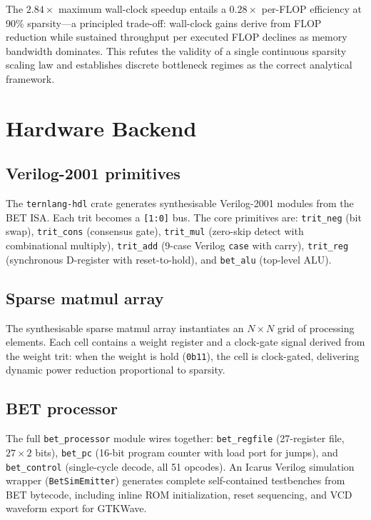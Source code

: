 \documentclass[journal,10pt,twocolumn]{IEEEtran}
\begin{document}
The $2.84\times$ maximum wall-clock speedup entails a $0.28\times$ per-FLOP
efficiency at 90\% sparsity---a principled trade-off: wall-clock gains
derive from FLOP reduction while sustained throughput per executed FLOP
declines as memory bandwidth dominates. This refutes the validity of a single
continuous sparsity scaling law and establishes discrete bottleneck regimes as
the correct analytical framework.

\section{Hardware Backend}
\label{sec:hdl}

\subsection{Verilog-2001 primitives}

The \texttt{ternlang-hdl} crate generates synthesisable Verilog-2001 modules
from the BET ISA. Each trit becomes a \texttt{[1:0]} bus. The core primitives
are: \texttt{trit\_neg} (bit swap), \texttt{trit\_cons} (consensus gate),
\texttt{trit\_mul} (zero-skip detect with combinational multiply),
\texttt{trit\_add} (9-case Verilog \texttt{case} with carry),
\texttt{trit\_reg} (synchronous D-register with reset-to-hold), and
\texttt{bet\_alu} (top-level ALU).

\subsection{Sparse matmul array}

The synthesisable sparse matmul array instantiates an $N \times N$ grid of
processing elements. Each cell contains a weight register and a clock-gate
signal derived from the weight trit: when the weight is hold (\texttt{0b11}),
the cell is clock-gated, delivering dynamic power reduction proportional to
sparsity.

\subsection{BET processor}

The full \texttt{bet\_processor} module wires together: \texttt{bet\_regfile}
(27-register file, $27 \times 2$ bits), \texttt{bet\_pc} (16-bit program
counter with load port for jumps), and \texttt{bet\_control} (single-cycle
decode, all 51 opcodes). An Icarus Verilog simulation wrapper
(\texttt{BetSimEmitter}) generates complete self-contained testbenches from
BET bytecode, including inline ROM initialization, reset sequencing, and VCD
waveform export for GTKWave.
\end{document}
